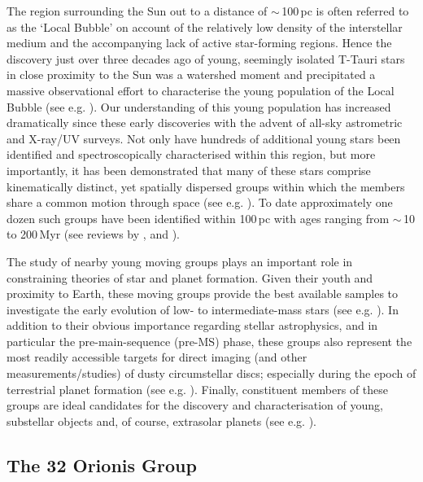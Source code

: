 \documentclass[usenatbib]{mnras}
\begin{document}
The region surrounding the Sun out to a distance of $\sim$\,100\,pc is
often referred to as the `Local Bubble' on account of the relatively
low density of the interstellar medium and the accompanying lack of
active star-forming regions. Hence the discovery just over three
decades ago of young, seemingly isolated T-Tauri stars in close
proximity to the Sun was a watershed moment and precipitated a massive
observational effort to characterise the young population of the Local
Bubble (see
e.g. \citealp{Rucinski83,delaReza89,Gregorio-Hetem92,Webb99}).  Our
understanding of this young population has increased dramatically
since these early discoveries with the advent of all-sky astrometric
and X-ray/UV surveys.  Not only have hundreds of additional young
stars been identified and spectroscopically characterised within this
region, but more importantly, it has been demonstrated that many of
these stars comprise kinematically distinct, yet spatially dispersed 
groups within which the members share a common motion through space
(see e.g. \citealp{Zuckerman00,Torres00}). To date approximately one
dozen such groups have been identified within 100\,pc with ages
ranging from $\sim$\,10 to 200\,Myr (see reviews by
\citealp{Zuckerman04a}, \citealp{Torres08} and \citealp{Mamajek16}).

The study of nearby young moving groups plays an important role in
constraining theories of star and planet formation. Given their youth
and proximity to Earth, these moving groups provide the best available
samples to investigate the early evolution of low- to
intermediate-mass stars (see e.g. \citealp{Mamajek14}). In addition to
their obvious importance regarding stellar astrophysics, and in
particular the pre-main-sequence (pre-MS) phase, these groups also
represent the most readily accessible targets for direct imaging (and
other measurements/studies) of dusty circumstellar discs; especially
during the epoch of terrestrial planet formation (see
e.g. \citealp{Canup04}). Finally, constituent members of these groups
are ideal candidates for the discovery and characterisation of young,
substellar objects and, of course, extrasolar planets (see
e.g. \citealp{Lagrange10}).

\subsection{The 32 Orionis Group}
\end{document}
